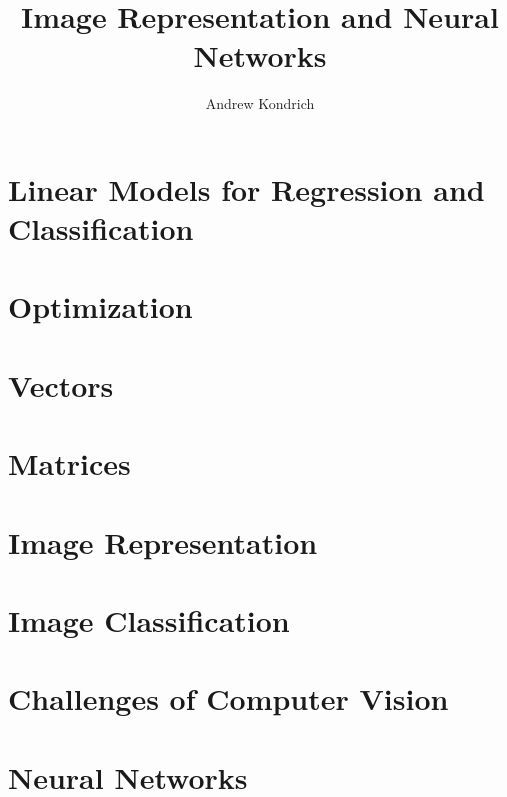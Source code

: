 \documentclass[11pt]{beamer}
\title[AI4ALL Computer Vision]{Image Representation and Neural Networks}
\author[Andrew Kondrich]{Andrew Kondrich}
\begin{document}


\section{Linear Models for Regression and Classification}


\section{Optimization}


\section{Vectors}


\section{Matrices}


\section{Image Representation}


\section{Image Classification}


\section{Challenges of Computer Vision}


\section{Neural Networks}


\begin{frame}
\titlepage 
\end{frame}
\end{document}
